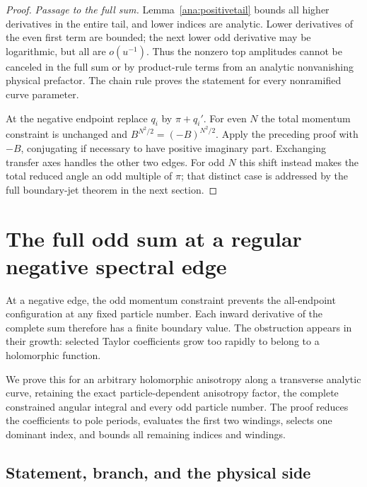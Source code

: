 \documentclass[11pt]{article}
\numberwithin{equation}{section}
\theoremstyle{definition}
\begin{document}
\begin{proof}
\emph{Passage to the full sum.}
Lemma~\ref{ana:positivetail} bounds all higher derivatives in the
entire tail, and lower indices are analytic. Lower derivatives of
the even first term are bounded; the next lower odd derivative
may be logarithmic, but all are \(o(u^{-1})\).
Thus the nonzero top amplitudes cannot be canceled in the full
sum or by product-rule terms from an analytic nonvanishing
physical prefactor. The chain rule proves the statement for every
nonramified curve parameter.

At the negative endpoint replace \(q_i\) by \(\pi+q_i'\).
For even \(N\) the total momentum constraint is unchanged and
\(B^{N^2/2}=(-B)^{N^2/2}\). Apply the preceding proof with
\(-B\), conjugating if necessary to have positive imaginary part.
Exchanging transfer axes handles the other two edges.
For odd \(N\) this shift instead makes the total reduced angle
an odd multiple of \(\pi\); that distinct case is addressed by
the full boundary-jet theorem in the next section.
\end{proof}

\section{The full odd sum at a regular negative spectral edge}
\label{neg:section}

At a negative edge, the odd momentum constraint prevents the
all-endpoint configuration at any fixed particle number. Each inward
derivative of the complete sum therefore has a finite boundary value.
The obstruction appears in their growth: selected Taylor coefficients
grow too rapidly to belong to a holomorphic function.

We prove this for an arbitrary holomorphic anisotropy along a
transverse analytic curve, retaining the exact particle-dependent
anisotropy factor, the complete constrained angular integral and every
odd particle number. The proof reduces the coefficients to pole
periods, evaluates the first two windings, selects one dominant index,
and bounds all remaining indices and windings.

\subsection{Statement, branch, and the physical side}
\label{neg:setup}
\end{document}
